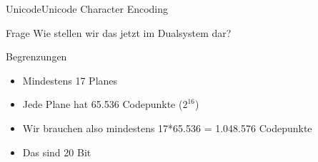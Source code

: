 \documentclass[xelatex,aspectratio=169]{beamer}
\begin{document}
\begin{frame}{Unicode}{Unicode Character Encoding}
    \begin{alertblock}{Frage}
        Wie stellen wir das jetzt im Dualsystem dar?
    \end{alertblock}
    \begin{block}{Begrenzungen}
        \begin{itemize}
            \item Mindestens 17 Planes
            \item Jede Plane hat 65.536 Codepunkte ($2^{16}$)
            \item Wir brauchen also mindestens 17*65.536 = 1.048.576 Codepunkte
            \item Das sind 20 Bit
        \end{itemize}
    \end{block}

\end{frame}

\end{document}
